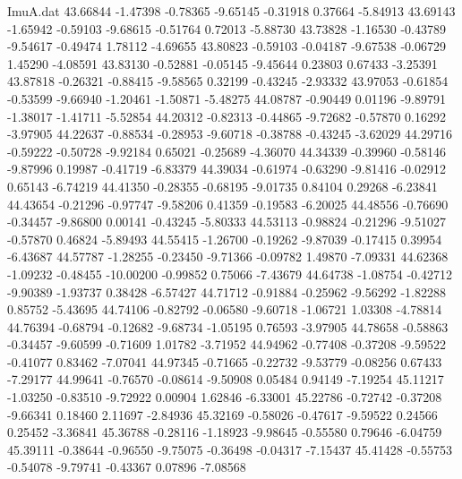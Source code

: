 \begin{filecontents}{ImuA.dat}
  43.66844   -1.47398   -0.78365   -9.65145   -0.31918    0.37664   -5.84913
  43.69143   -1.65942   -0.59103   -9.68615   -0.51764    0.72013   -5.88730
  43.73828   -1.16530   -0.43789   -9.54617   -0.49474    1.78112   -4.69655
  43.80823   -0.59103   -0.04187   -9.67538   -0.06729    1.45290   -4.08591
  43.83130   -0.52881   -0.05145   -9.45644    0.23803    0.67433   -3.25391
  43.87818   -0.26321   -0.88415   -9.58565    0.32199   -0.43245   -2.93332
  43.97053   -0.61854   -0.53599   -9.66940   -1.20461   -1.50871   -5.48275
  44.08787   -0.90449    0.01196   -9.89791   -1.38017   -1.41711   -5.52854
  44.20312   -0.82313   -0.44865   -9.72682   -0.57870    0.16292   -3.97905
  44.22637   -0.88534   -0.28953   -9.60718   -0.38788   -0.43245   -3.62029
  44.29716   -0.59222   -0.50728   -9.92184    0.65021   -0.25689   -4.36070
  44.34339   -0.39960   -0.58146   -9.87996    0.19987   -0.41719   -6.83379
  44.39034   -0.61974   -0.63290   -9.81416   -0.02912    0.65143   -6.74219
  44.41350   -0.28355   -0.68195   -9.01735    0.84104    0.29268   -6.23841
  44.43654   -0.21296   -0.97747   -9.58206    0.41359   -0.19583   -6.20025
  44.48556   -0.76690   -0.34457   -9.86800    0.00141   -0.43245   -5.80333
  44.53113   -0.98824   -0.21296   -9.51027   -0.57870    0.46824   -5.89493
  44.55415   -1.26700   -0.19262   -9.87039   -0.17415    0.39954   -6.43687
  44.57787   -1.28255   -0.23450   -9.71366   -0.09782    1.49870   -7.09331
  44.62368   -1.09232   -0.48455  -10.00200   -0.99852    0.75066   -7.43679
  44.64738   -1.08754   -0.42712   -9.90389   -1.93737    0.38428   -6.57427
  44.71712   -0.91884   -0.25962   -9.56292   -1.82288    0.85752   -5.43695
  44.74106   -0.82792   -0.06580   -9.60718   -1.06721    1.03308   -4.78814
  44.76394   -0.68794   -0.12682   -9.68734   -1.05195    0.76593   -3.97905
  44.78658   -0.58863   -0.34457   -9.60599   -0.71609    1.01782   -3.71952
  44.94962   -0.77408   -0.37208   -9.59522   -0.41077    0.83462   -7.07041
  44.97345   -0.71665   -0.22732   -9.53779   -0.08256    0.67433   -7.29177
  44.99641   -0.76570   -0.08614   -9.50908    0.05484    0.94149   -7.19254
  45.11217   -1.03250   -0.83510   -9.72922    0.00904    1.62846   -6.33001
  45.22786   -0.72742   -0.37208   -9.66341    0.18460    2.11697   -2.84936
  45.32169   -0.58026   -0.47617   -9.59522    0.24566    0.25452   -3.36841
  45.36788   -0.28116   -1.18923   -9.98645   -0.55580    0.79646   -6.04759
  45.39111   -0.38644   -0.96550   -9.75075   -0.36498   -0.04317   -7.15437
  45.41428   -0.55753   -0.54078   -9.79741   -0.43367    0.07896   -7.08568

\end{filecontents}
